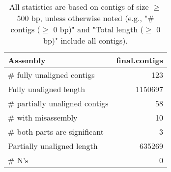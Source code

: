 \documentclass[12pt,a4paper]{article}
\begin{document}
\begin{table}[ht]
\begin{center}
\caption{All statistics are based on contigs of size $\geq$ 500 bp, unless otherwise noted (e.g., "\# contigs ($\geq$ 0 bp)" and "Total length ($\geq$ 0 bp)" include all contigs).}
\begin{tabular}{|l*{1}{|r}|}
\hline
Assembly & final.contigs \\ \hline
\# fully unaligned contigs & 123 \\ \hline
Fully unaligned length & 1150697 \\ \hline
\# partially unaligned contigs & 58 \\ \hline
\hspace{5mm}\# with misassembly & 10 \\ \hline
\hspace{5mm}\# both parts are significant & 3 \\ \hline
Partially unaligned length & 635269 \\ \hline
\# N's & 0 \\ \hline
\end{tabular}
\end{center}
\end{table}
\end{document}

